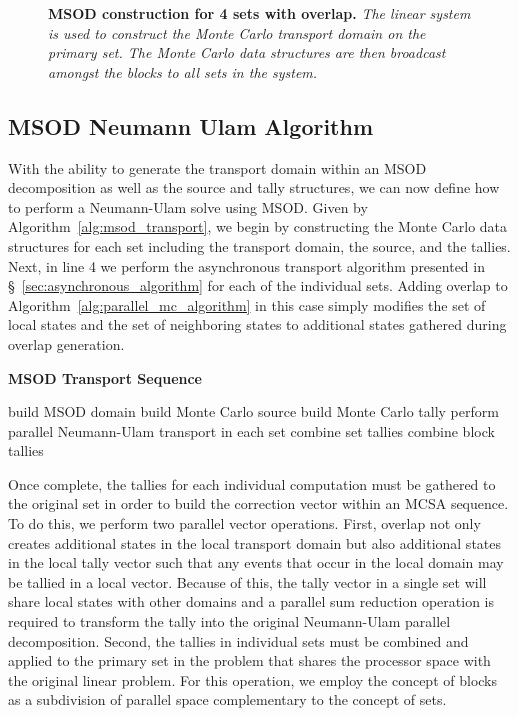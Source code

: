 \begin{figure}[t!]
  \begin{center}
    \scalebox{0.6}{  }
  \end{center}
  \caption{\textbf{MSOD construction for 4 sets with overlap.}
    \textit{The linear system is used to construct the Monte Carlo
      transport domain on the primary set. The Monte Carlo data
      structures are then broadcast amongst the blocks to all sets in
      the system.}}
  \label{fig:msod_construction}
\end{figure}

\clearpage

\subsection{MSOD Neumann Ulam Algorithm }
\label{subsec:msod_algorithm}

With the ability to generate the transport domain within an MSOD
decomposition as well as the source and tally structures, we can now
define how to perform a Neumann-Ulam solve using MSOD. Given by
Algorithm~\ref{alg:msod_transport}, we begin by constructing the Monte
Carlo data structures for each set including the transport domain, the
source, and the tallies. Next, in line 4 we perform the asynchronous
transport algorithm presented in \S~\ref{sec:asynchronous_algorithm}
for each of the individual sets. Adding overlap to
Algorithm~\ref{alg:parallel_mc_algorithm} in this case simply modifies
the set of local states and the set of neighboring states to
additional states gathered during overlap generation.

\begin{algorithm}[h!]
  \caption{\textbf{MSOD Transport Sequence}}
  \label{alg:msod_transport}
  \begin{algorithmic}[1]
    \State build MSOD domain
    \State build Monte Carlo source
    \State build Monte Carlo tally
    \State perform parallel Neumann-Ulam transport in each set
    \State combine set tallies
    \State combine block tallies
  \end{algorithmic}
\end{algorithm}

Once complete, the tallies for each individual computation must be
gathered to the original set in order to build the correction vector
within an MCSA sequence. To do this, we perform two parallel vector
operations. First, overlap not only creates additional states in the
local transport domain but also additional states in the local tally
vector such that any events that occur in the local domain may be
tallied in a local vector. Because of this, the tally vector in a
single set will share local states with other domains and a parallel
sum reduction operation is required to transform the tally into the
original Neumann-Ulam parallel decomposition. Second, the tallies in
individual sets must be combined and applied to the primary set in the
problem that shares the processor space with the original linear
problem. For this operation, we employ the concept of blocks as a
subdivision of parallel space complementary to the concept of sets.

